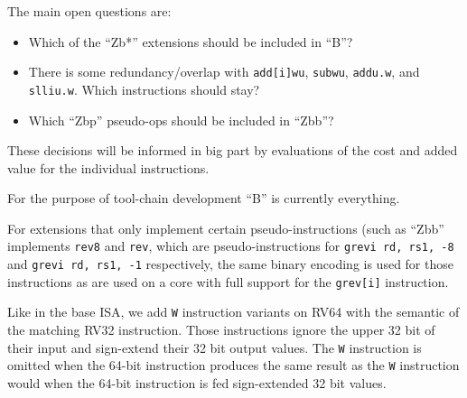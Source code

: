 \begin{center}
\end{center}

The main open questions are:
\begin{itemize}
\item Which of the ``Zb*'' extensions should be included in ``B''?
\item There is some redundancy/overlap with {\tt add[i]wu}, {\tt subwu}, {\tt addu.w}, and {\tt slliu.w}. Which instructions should stay?
\item Which ``Zbp'' pseudo-ops should be included in ``Zbb''?
\end{itemize}

These decisions will be informed in big part by evaluations of the cost and
added value for the individual instructions.

For the purpose of tool-chain development ``B'' is currently everything.

For extensions that only implement certain pseudo-instructions (such as ``Zbb''
implements {\tt rev8} and {\tt rev}, which are pseudo-instructions for {\tt grevi rd, rs1, -8}
and {\tt grevi rd, rs1, -1} respectively, the same binary encoding is used for those
instructions as are used on a core with full support for the {\tt grev[i]} instruction.

Like in the base ISA, we add {\tt *W} instruction variants on RV64 with the
semantic of the matching RV32 instruction. Those instructions ignore the upper
32 bit of their input and sign-extend their 32 bit output values. The {\tt *W}
instruction is omitted when the 64-bit instruction produces the same result as
the {\tt *W} instruction would when the 64-bit instruction is fed sign-extended
32 bit values.

